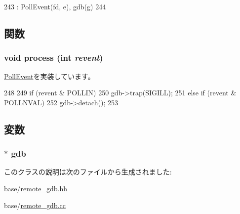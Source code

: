 \begin{DoxyCode}
243     : PollEvent(fd, e), gdb(g)
244 {}
\end{DoxyCode}


\subsection{関数}
\hypertarget{classBaseRemoteGDB_1_1Event_aedacbaeee0c89ceca526874c34f6b20b}{
\subsubsection[{process}]{\setlength{\rightskip}{0pt plus 5cm}void process (int {\em revent})}}
\label{classBaseRemoteGDB_1_1Event_aedacbaeee0c89ceca526874c34f6b20b}


\hyperlink{classPollEvent_a8b870dc0eeb339499d64aa56fc0e2aa5}{PollEvent}を実装しています。


\begin{DoxyCode}
248 {
249     if (revent & POLLIN)
250         gdb->trap(SIGILL);
251     else if (revent & POLLNVAL)
252         gdb->detach();
253 }
\end{DoxyCode}


\subsection{変数}
\hypertarget{classBaseRemoteGDB_1_1Event_abc7630d7a55d0751927fed9b12d7b202}{
\subsubsection[{gdb}]{$\ast$ {\bf gdb}}}
\label{classBaseRemoteGDB_1_1Event_abc7630d7a55d0751927fed9b12d7b202}


このクラスの説明は次のファイルから生成されました:\begin{DoxyCompactItemize}
\item 
base/\hyperlink{base_2remote__gdb_8hh}{remote\_\-gdb.hh}\item 
base/\hyperlink{base_2remote__gdb_8cc}{remote\_\-gdb.cc}\end{DoxyCompactItemize}

